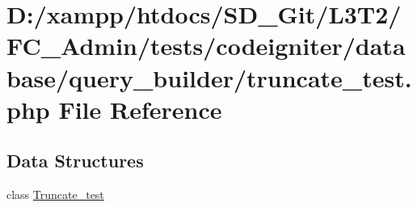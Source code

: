 \hypertarget{_admin_2tests_2codeigniter_2database_2query__builder_2truncate__test_8php}{}\section{D\+:/xampp/htdocs/\+S\+D\+\_\+\+Git/\+L3\+T2/\+F\+C\+\_\+\+Admin/tests/codeigniter/database/query\+\_\+builder/truncate\+\_\+test.php File Reference}
\label{_admin_2tests_2codeigniter_2database_2query__builder_2truncate__test_8php}
\subsection*{Data Structures}
\begin{DoxyCompactItemize}
\item 
class \hyperlink{class_truncate__test}{Truncate\+\_\+test}
\end{DoxyCompactItemize}
